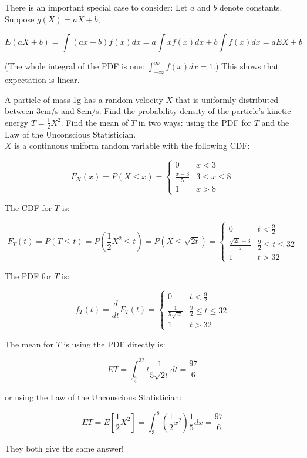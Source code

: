 There is an important special case to consider: Let $a$ and $b$ denote constants. Suppose $g(X)=aX+b$,

\[ E(aX+b)=\int (ax+b)f(x)dx=a\int xf(x)dx+b\int f(x) dx = aEX+b \]

(The whole integral of the PDF is one: $\int_{-\infty}^\infty f(x) dx=1$.) This shows that expectation is linear.

\begin{texample}
	A particle of mass 1g has a random velocity $X$ that is uniformly distributed between 3cm/s and 8cm/s. Find the probability density of the particle's kinetic energy $T=\frac12X^2$. Find the mean of $T$ in two ways: using the PDF for $T$ and the Law of the Unconscious Statistician. \\
	
	$X$ is a continuous uniform random variable with the following CDF:
	
	\[F_X(x)=P(X\le x)=\begin{cases} 0 & x<3 \\ \frac{x-3}{5} & 3\le x \le8 \\ 1 & x>8 \end{cases}\]
	
	The CDF for $T$ is:
	
	\[F_T(t)=P(T\le t)=P\left(\frac12X^2\le t\right)=P(X\le\sqrt{2t})=\begin{cases} 0 & t<\frac92 \\ \frac{\sqrt{2t}-3}{5} & \frac92\le t \le32 \\ 1 & t>32 \end{cases}\]
	
	The PDF for $T$ is:
	
	\[f_T(t)=\frac{d}{dt}F_T(t)=\begin{cases} 0 & t<\frac92 \\ \frac{1}{5\sqrt{2t}} & \frac92\le t \le32 \\ 1 & t>32 \end{cases}\]
	
	The mean for $T$ is using the PDF directly is:
	
	\[ET=\int_{\frac92}^{32} t\frac{1}{5\sqrt{2t}} dt=\frac{97}{6}\]
	
	or using the Law of the Unconscious Statistician:
	
	\[ET=E[\frac12X^2]=\int_3^8 \left( \frac12x^2 \right)\frac{1}{5}dx=\frac{97}{6}\]
	
	They both give the same answer!
\end{texample}

